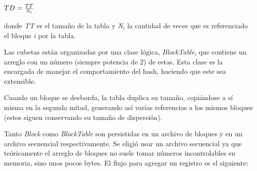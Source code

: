 \documentclass{article}
\begin{document}
	\begin{center}
	$TD = {TT \over N_i}$
	\end{center}
	\medskip

	donde \textit{TT} es el tamaño de la tabla y \textit{N$_i$} la cantidad de veces que es referenciado el bloque \textit{i} por la tabla.
	\par
	Las cubetas están organizadas por una clase lógica, \textit{BlockTable}, que contiene un arreglo con un número (siempre potencia de 2) de estas. Esta clase es la encargada de manejar el comportamiento del hash, haciendo que este sea extensible.
	\par
	Cuando un bloque se desborda, la tabla duplica su tamaño, copiándose a sí misma en la segunda mitad, generando así varias referencias a los mismos bloques (estos siguen conservando su tamaño de dispersión).
	\par
	Tanto \textit{Block} como \textit{BlockTable} son persistidas en un archivo de bloques y en un archivo secuencial respectivamente. Se eligió usar un archivo secuencial ya que teóricamente el arreglo de bloques no suele tomar números incontrolables en memoria, sino unos pocos bytes.
	El flujo para agregar un registro es el siguiente:
	\bigskip
\end{document}
